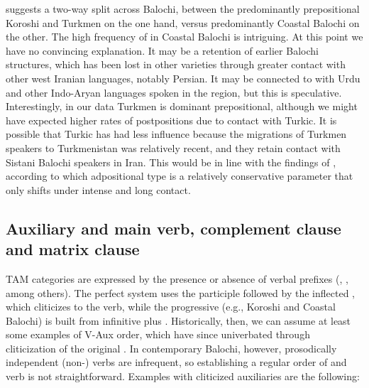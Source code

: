 \documentclass[output=paper,colorlinks,citecolor=brown,draftmode]{langscibook}
\begin{document}
 suggests a two-way split across Balochi, between the predominantly prepositional Koroshi and Turkmen on the one hand, versus predominantly  Coastal Balochi on the other. The high frequency of   in Coastal Balochi is intriguing. At this point we have no convincing explanation. It may be a retention of earlier Balochi structures, which has been lost in other varieties through greater contact with other west Iranian languages, notably Persian. It may be connected to  with Urdu and other  Indo-Aryan languages spoken in the region, but this is speculative. Interestingly, in our data Turkmen is dominant prepositional, although we might have expected higher rates of postpositions due to contact with Turkic. It is possible that Turkic has had less influence because the migrations of Turkmen speakers to Turkmenistan was relatively recent, and they retain contact with Sistani Balochi speakers in Iran. This would be in line with the findings of \citet{haig_which_2023}, according to which adpositional type is a relatively conservative  parameter that only shifts under intense and long contact.

\subsection{Auxiliary and main verb, complement clause and matrix clause}\label{Balochi:ss:3.3}

TAM categories are expressed by the presence or absence of verbal prefixes (\citealt{jahani_balochi_2009}, \citealt{axenov_balochi_2006}, \citealt{nourzaei_koroshi_2015} among others). The perfect system uses the participle followed by the inflected , which cliticizes to the verb, while the progressive (e.g., Koroshi and Coastal Balochi) is built from infinitive plus  . Historically, then, we can assume at least some examples of V-Aux order, which have since univerbated through cliticization of the original . In contemporary Balochi, however, prosodically independent (non-)  verbs are infrequent, so establishing a regular order of  and verb is not straightforward. Examples with cliticized auxiliaries are the following:
\end{document}

